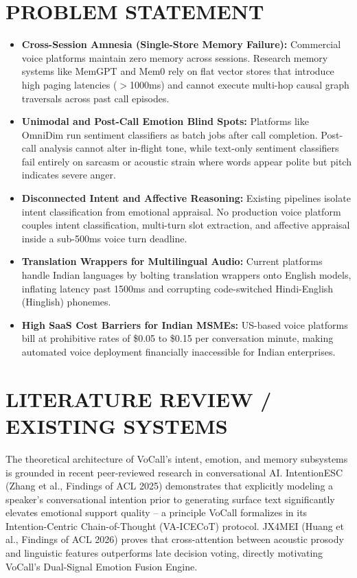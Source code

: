 \documentclass[12pt,a4paper]{article}
\begin{document}
\section{PROBLEM STATEMENT}
\begin{itemize}
    \item \textbf{Cross-Session Amnesia (Single-Store Memory Failure):} Commercial voice platforms maintain zero memory across sessions. Research memory systems like MemGPT and Mem0 rely on flat vector stores that introduce high paging latencies ($>$1000ms) and cannot execute multi-hop causal graph traversals across past call episodes.
    \item \textbf{Unimodal and Post-Call Emotion Blind Spots:} Platforms like OmniDim run sentiment classifiers as batch jobs after call completion. Post-call analysis cannot alter in-flight tone, while text-only sentiment classifiers fail entirely on sarcasm or acoustic strain where words appear polite but pitch indicates severe anger.
    \item \textbf{Disconnected Intent and Affective Reasoning:} Existing pipelines isolate intent classification from emotional appraisal. No production voice platform couples intent classification, multi-turn slot extraction, and affective appraisal inside a sub-500ms voice turn deadline.
    \item \textbf{Translation Wrappers for Multilingual Audio:} Current platforms handle Indian languages by bolting translation wrappers onto English models, inflating latency past 1500ms and corrupting code-switched Hindi-English (Hinglish) phonemes.
    \item \textbf{High SaaS Cost Barriers for Indian MSMEs:} US-based voice platforms bill at prohibitive rates of \$0.05 to \$0.15 per conversation minute, making automated voice deployment financially inaccessible for Indian enterprises.
\end{itemize}

\section{LITERATURE REVIEW / EXISTING SYSTEMS}
The theoretical architecture of VoCall's intent, emotion, and memory subsystems is grounded in recent peer-reviewed research in conversational AI. IntentionESC (Zhang et al., Findings of ACL 2025) demonstrates that explicitly modeling a speaker's conversational intention prior to generating surface text significantly elevates emotional support quality -- a principle VoCall formalizes in its Intention-Centric Chain-of-Thought (VA-ICECoT) protocol. JX4MEI (Huang et al., Findings of ACL 2026) proves that cross-attention between acoustic prosody and linguistic features outperforms late decision voting, directly motivating VoCall's Dual-Signal Emotion Fusion Engine.
\end{document}
